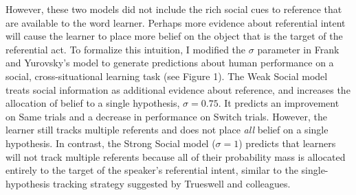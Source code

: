 \documentclass[man]{apa2}
\begin{document}
However, these two models did not include the rich social cues to reference that are available to the word learner. Perhaps more evidence about referential intent will cause the learner to place more belief on the object that is the target of the referential act. To formalize this intuition, I modified the $\sigma$ parameter in Frank and Yurovsky's model to generate predictions about human performance on a social, cross-situational learning task (see Figure 1). The Weak Social model treats social information as additional evidence about reference, and increases the allocation of belief to a single hypothesis, $\sigma = 0.75$. It predicts an improvement on Same trials and a decrease in performance on Switch trials. However, the learner still tracks multiple referents and does not place \emph{all} belief on a single hypothesis. In contrast, the Strong Social model ($\sigma = 1$) predicts that learners will not track multiple referents because all of their probability mass is allocated entirely to the target of the speaker's referential intent, similar to the single-hypothesis tracking strategy suggested by Trueswell and colleagues. 









\end{document}
